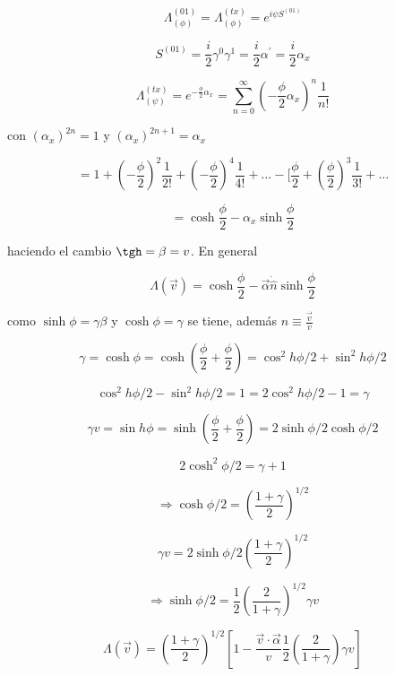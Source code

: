 \documentclass{report}
\begin{document}
\begin{equation}
\Lambda^{(01)}_{(\phi)} = \Lambda^{(tx)}_{(\phi)} = e^{i \psi S^{(01)}}
\end{equation}

\[S^{(01)} = \frac{i}{2} \gamma^{0} \gamma^1 = \frac{i}{2} \alpha^{\prime} = \frac{i}{2} \alpha_{x}\]

\[\Lambda^{(tx)}_{(\psi)} = e^{- \frac{\phi}{2} \alpha_{x}} = \sum_{n = 0}^{\infty}(-\frac{\phi}{2} \alpha_{x})^n \frac{1}{n!} \]

con $(\alpha_{x})^{2n} = 1$ y $(\alpha_{x})^{2n+1} = \alpha_{x}$

\[= 1 + (-\frac{\phi}{2})^2 \frac{1}{2!}+ (-\frac{\phi}{2})^4 \frac{1}{4!} + \ldots -[\frac{\phi}{2} + (\frac{\phi}{2})^3 \frac{1}{3!}+ \ldots \]

\[= \cosh \frac{\phi}{2} - \alpha_{x} \sinh \frac{\phi}{2}\]

haciendo el cambio $\tgh = \beta = v$. En general

\begin{equation}
\Lambda(\overrightarrow{v}) = \cosh \frac{\phi}{2} - \overrightarrow{\alpha} \dot{ \hat{n}} \sinh \frac{\phi}{2}
\end{equation}

como $\sinh \phi = \gamma \beta$ y $\cosh \phi = \gamma$ se tiene, además $\hat{n} \equiv \frac{\overrightarrow{v}}{v}$

\[\gamma = \cosh \phi = \cosh (\frac{\phi}{2} + \frac{\phi}{2}) = \cos^2 h \phi/2 + \sin ^2 h \phi/2\]

\[\cos ^2h \phi/2 - \sin^2 h \phi/2 = 1 = 2 \cos^2h \phi/2 - 1 = \gamma \]

\[\gamma v = \sin h \phi = \sinh (\frac{\phi}{2} + \frac{\phi}{2}) = 2 \sinh \phi / 2 \cosh \phi / 2\]

\[2 \cosh^2 \phi / 2 = \gamma + 1\]

\begin{equation}
\Rightarrow \cosh \phi/2 = (\frac{1+\gamma}{2})^{1/2}
\end{equation}

\[\gamma v = 2 \sinh \phi / 2 (\frac{1+\gamma}{2})^{1/2}\]

\begin{equation}
\Rightarrow \sinh \phi/2 = \frac{1}{2} (\frac{2}{1+\gamma})^{1/2} \gamma v
\end{equation}

\[\Lambda(\overrightarrow{v}) = (\frac{1+\gamma}{2})^{1/2} [1-\frac{\overrightarrow{v} \cdot \overrightarrow{\alpha}}{v} \frac{1}{2} (\frac{2}{1+\gamma})\gamma v]\]
\end{document}
